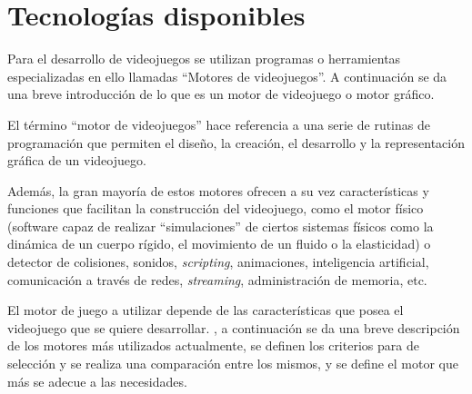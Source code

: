 \section{Tecnologías disponibles}



Para el desarrollo de videojuegos se utilizan programas o herramientas
especializadas en ello llamadas \enquote{Motores de videojuegos}. A continuación
se da una breve introducción de lo que es un motor de videojuego o motor
gráfico.

El término \enquote{motor de videojuegos} hace referencia a una serie de rutinas
de programación que permiten el diseño, la creación, el desarrollo y la
representación gráfica de un videojuego\cite{videojuego:telechea}.

Además, la gran mayoría de estos motores ofrecen a su vez características y
funciones que facilitan la construcción del videojuego, como el motor físico
(software capaz de realizar \enquote{simulaciones} de ciertos sistemas físicos
como la dinámica de un cuerpo rígido, el movimiento de un fluido o la
elasticidad) o detector de colisiones, sonidos, \textit{scripting}, animaciones,
inteligencia artificial, comunicación a través de redes, \textit{streaming},
administración de memoria, etc\cite{videojuego:telechea}.

El motor de juego a utilizar depende de las características que posea el
videojuego que se quiere desarrollar. , a continuación
se da una breve descripción de los motores más utilizados actualmente, se
definen los criterios para de selección y se realiza una comparación entre los
mismos, y se define el motor que más se adecue a las necesidades.


